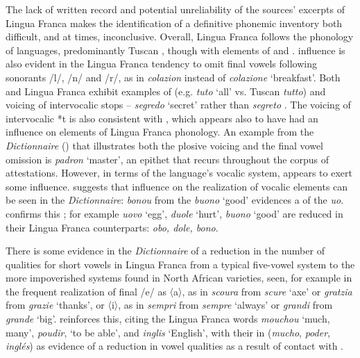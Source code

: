 \documentclass[output=paper]{langsci/langscibook}
\begin{document}
	The  lack of written record and potential unreliability of the sources’ excerpts of Lingua Franca makes the identification of a definitive phonemic inventory both difficult, and at times, inconclusive. Overall, Lingua Franca follows the phonology of  languages, predominantly Tuscan , though with elements of  and .  influence is also evident in the Lingua Franca tendency to omit final vowels following sonorants /l/, /n/ and /r/, as in \textit{colazion} instead of \textit{colazione} ‘breakfast’. Both  and Lingua Franca exhibit examples of  (e.g. \textit{tuto} `all' vs. Tuscan \textit{tutto}) and voicing of intervocalic stops – \textit{segredo} `secret' rather than \textit{segreto} \citep{Ursini2011}. The voicing of intervocalic *t is also consistent with , which appears also to have had an influence on elements of Lingua Franca phonology. An example from the \textit{Dictionnaire} (\citeyear[63]{Anonymous1830}) that illustrates both the plosive voicing and the final vowel omission is \textit{padron} ‘master’, an epithet that recurs throughout the corpus of attestations. However, in terms of the language’s vocalic system,  appears to exert some influence. \citet{Cifoletti2004} suggests that  influence on the realization of vocalic elements can be seen in the \textit{Dictionnaire}: \textit{bonou} from the  \textit{buono} ‘good’ evidences a  of the  \textit{uo}. \citet[444]{Bergareche1993} confirms this ; for example  \textit{uovo} ‘egg’, \textit{duole} ‘hurt’, \textit{buono} ‘good’ are reduced in their Lingua Franca counterparts: \textit{obo, dole, bono}. 
	
	There is some evidence in the \textit{Dictionnaire} of a reduction in the number of qualities for short vowels in Lingua Franca from a typical five-vowel  system to the more impoverished systems found in North African  varieties, seen, for example in the frequent realization of final /e/ as 〈a〉, as in \textit{scoura} from \textit{scure} ‘axe’ or \textit{gratzia} from \textit{grazie} ‘thanks’, or 〈i〉, as in \textit{sempri} from \textit{sempre} ‘always’ or \textit{grandi} from \textit{grande} ‘big’. \citet[444]{Bergareche1993} reinforces this, citing the Lingua Franca words \textit{mouchou} ‘much, many’, \textit{poudir}, ‘to be able’, and \textit{inglis} ‘English’, with their  in  (\textit{mucho}, \textit{poder}, \textit{inglés}) as evidence of a reduction in vowel qualities as a result of contact with . 
	
\end{document}
